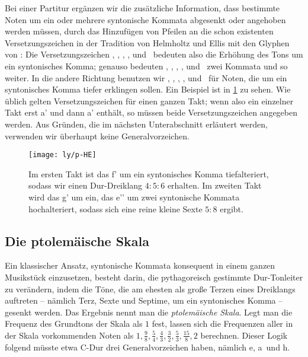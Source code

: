 Bei einer Partitur ergänzen wir die zusätzliche Information, dass bestimmte
Noten um ein oder mehrere syntonische Kommata abgesenkt oder angehoben werden
müssen, durch das Hinzufügen von Pfeilen an die schon existenten
Versetzungszeichen in der Tradition von Helmholtz und Ellis \cite{HE} mit den
Glyphen von \cite{HEJI}: Die Versetzungszeichen \dsharpp, \sharpp, \naturalp,
\flatp, und \dflatp\ bedeuten also die Erhöhung des Tons um ein syntonisches
Komma; genauso bedeuten \dsharppp, \sharppp, \naturalpp, \flatpp, und \dflatpp\
zwei Kommata und so weiter. In die andere Richtung benutzen wir \dsharpm,
\sharpm, \naturalm, \flatm, und \dflatm\ für Noten, die um ein syntonisches
Komma tiefer erklingen sollen. Ein Beispiel ist in \cref{fig:HE} zu sehen. Wie
üblich gelten Versetzungszeichen für einen ganzen Takt; wenn also ein einzelner
Takt erst \naturalm a’ und dann \natural a’ enthält, so müssen beide
Versetzungszeichen angegeben werden. Aus Gründen, die im nächsten Unterabschnitt
erläutert werden, verwenden wir überhaupt keine Generalvorzeichen.\looseness-1

\begin{figure}\centering
  \texttt{[image: ly/p-HE]}
  \caption{Im ersten Takt ist das \sharp f’ um ein syntonisches Komma
    tiefalteriert, sodass wir einen Dur-Dreiklang $4:5:6$ erhalten. Im zweiten
    Takt wird das g’ um ein, das \flat e’’ um zwei syntonische Kommata
    hochalteriert, sodass sich eine reine kleine Sexte $5:8$
    ergibt.}\label{fig:HE}
\end{figure}

\subsection{Die ptolemäische Skala}
\label{subsec:ptol}

Ein klassischer Ansatz, syntonische Kommata konsequent in einem ganzen
Musikstück einzusetzen, besteht darin, die pythagoreisch gestimmte Dur-Tonleiter
zu verändern, indem die Töne, die am ehesten als große Terzen eines Dreiklangs
auftreten – nämlich Terz, Sexte und Septime, um ein syntonisches Komma – gesenkt
werden. Das Ergebnis nennt man die \emph{ptolemäische Skala}. Legt man die
Frequenz des Grundtons der Skala als $1$ fest, lassen sich die Frequenzen aller
in der Skala vorkommenden Noten als
$1,\frac98,\frac54,\frac43,\frac32,\frac53,\frac{15}8,2$ berechnen. Dieser Logik
folgend müsste etwa C-Dur drei Generalvorzeichen haben, nämlich \naturalm e,
\naturalm a\ und \naturalm h.

